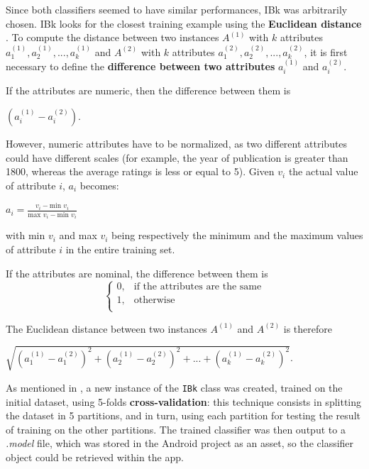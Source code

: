 \documentclass{mproj}
\begin{document}
Since both classifiers seemed to have similar performances, IBk was arbitrarily chosen. IBk looks for the closest training example using the \textbf{Euclidean distance} \cite[Chapter~11]{wekabook}. To compute the distance between two instances $A^{(1)}$ with $k$ attributes $a_1^{(1)}, a_2^{(1)}, ..., a_k^{(1)}$ and $A^{(2)}$ with $k$ attributes $a_1^{(2)}, a_2^{(2)}, ..., a_k^{(2)}$, it is first necessary to define the \textbf{difference between two attributes} $a_i^{(1)}$ and $a_i^{(2)}$. \cite[Chapter~4]{wekabook}

If the attributes are numeric, then the difference between them is 
\begin{center}
	\vspace{-5mm}
	$(a_i^{(1)} - a_i^{(2)})$.
\end{center}

However, numeric attributes have to be normalized, as two different attributes could have different scales (for example, the year of publication is greater than 1800, whereas the average ratings is less or equal to 5). Given $v_i$ the actual value of attribute $i$, $a_i$ becomes:
\begin{center}
	\vspace{-5mm}
	$a_i = \frac{v_i - \text{min } v_i}{\text{max } v_i - \text{min } v_i}$
\end{center}
with min $v_i$ and max $v_i$ being respectively the minimum and the maximum values of attribute $i$ in the entire training set. 

If the attributes are nominal, the difference between them is
\begin{equation}
	\begin{cases}
		0, & \text{if the attributes are the same}\\
		1, & \text{otherwise}\\
	\end{cases}
\end{equation}

The Euclidean distance between two instances $A^{(1)}$ and $A^{(2)}$ is therefore
\begin{center}
	$\sqrt{(a_1^{(1)} - a_1^{(2)})^2 + (a_2^{(1)} - a_2^{(2)})^2 + ... + (a_k^{(1)} - a_k^{(2)})^2}$.
\end{center}

As mentioned in , a new instance of the \verb|IBk| class was created, trained on the initial dataset, using 5-folds \textbf{cross-validation}: this technique consists in splitting the dataset in 5 partitions, and in turn, using each partition for testing the result of training on the other partitions. \cite[Chapter~5]{wekabook} The trained classifier was then output to a \textit{.model} file, which was stored in the Android project as an asset, so the classifier object could be retrieved within the app.
\end{document}
